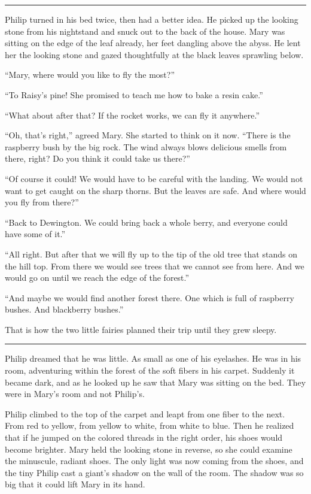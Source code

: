 \documentclass[10pt]{memoir}
\renewcommand{\pfbreakdisplay}{\bigskip \ding{166} \bigskip}
\newcommand{\secbreak}{\fancybreak{\pfbreakdisplay}}
\begin{document}
\secbreak

Philip turned in his bed twice, then had a better idea. He picked up the
looking stone from his nightstand and snuck out to the back of the house. Mary
was sitting on the edge of the leaf already, her feet dangling above the abyss.
He lent her the looking stone and gazed thoughtfully at the black leaves
sprawling below.

``Mary, where would you like to fly the most?''

``To Raisy's pine! She promised to teach me how to bake a resin cake.''

``What about after that? If the rocket works, we can fly it anywhere.''

``Oh, that's right,'' agreed Mary. She started to think on it now. ``There is
the raspberry bush by the big rock. The wind always blows delicious smells from
there, right? Do you think it could take us there?''

``Of course it could! We would have to be careful with the landing. We would
not want to get caught on the sharp thorns. But the leaves are safe. And where
would you fly from there?''

``Back to Dewington. We could bring back a whole berry, and everyone could have
some of it.''

``All right. But after that we will fly up to the tip of the old tree that
stands on the hill top. From there we would see trees that we cannot see from
here. And we would go on until we reach the edge of the forest.''

``And maybe we would find another forest there. One which is full of raspberry
bushes. And blackberry bushes.''

That is how the two little fairies planned their trip until they grew sleepy.

\secbreak

Philip dreamed that he was little. As small as one of his eyelashes. He was in
his room, adventuring within the forest of the soft fibers in his carpet.
Suddenly it became dark, and as he looked up he saw that Mary was sitting on
the bed. They were in Mary's room and not Philip's.

Philip climbed to the top of the carpet and leapt from one fiber to the next.
From red to yellow, from yellow to white, from white to blue. Then he realized
that if he jumped on the colored threads in the right order, his shoes would
become brighter. Mary held the looking stone in reverse, so she could examine
the minuscule, radiant shoes. The only light was now coming from the shoes, and
the tiny Philip cast a giant's shadow on the wall of the room. The shadow was
so big that it could lift Mary in its hand.
\end{document}
